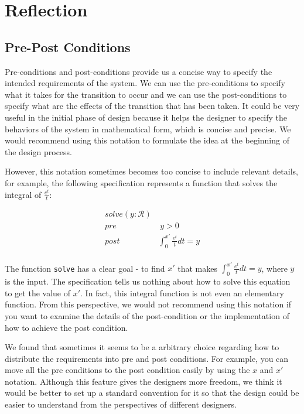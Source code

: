 \documentclass[titlepage]{article}
\begin{document}
\section{Reflection}

\subsection{Pre-Post Conditions}

Pre-conditions and post-conditions provide us a concise way to specify the intended requirements of the system. We can use the pre-conditions to specify what it takes for the transition to occur and we can use the post-conditions to specify what are the effects of the transition that has been taken. It could be very useful in the initial phase of design because it helps the designer to specify the behaviors of the system in mathematical form, which is concise and precise. We would recommend using this notation to formulate the idea at the beginning of the design process.

However, this notation sometimes becomes too concise to include relevant details, for example, the following specification represents a function that solves the integral of $\frac{e^t}{t}$:

\begin{align*}
solve(y: \mathcal{R}) & \\
   pre & \ y > 0 \\
  post & \int_{0}^{x'} \frac{e^t}{t} dt = y  \\
\end{align*}

The function \texttt{solve} has a clear goal - to find $x'$ that makes $\int_{0}^{x'} \frac{e^t}{t} dt = y$, where $y$ is the input. The specification tells us nothing about how to solve this equation to get the value of $x'$. In fact, this integral function is not even an elementary function. From this perspective, we would not recommend using this notation if you want to examine the details of the post-condition or the implementation of how to achieve the post condition.

We found that sometimes it seems to be a arbitrary choice regarding how to distribute the requirements into pre and post conditions. For example, you can move all the pre conditions to the post condition easily by using the $x$ and $x'$ notation. Although this feature gives the designers more freedom, we think it would be better to set up a standard convention for it so that the design could be easier to understand from the perspectives of different designers.
\end{document}
